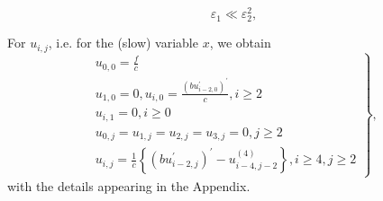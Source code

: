 \documentclass[10pt,a4paper]{amsart}
\begin{document}
\begin{equation}
\varepsilon _{1} \ll \varepsilon _{2}^{2},  \label{eps_relation}
\end{equation}%

For $u_{i,j}$, i.e. for the (slow) variable $x$, we obtain
%
\begin{equation}
\left. 
\begin{array}{c}
u_{0,0} = \frac{f}{c} \\
u_{1,0}=0,u_{i,0}=\frac{\left( bu_{i-2,0}^{\prime }\right) ^{\prime }}{c}%
,i\geq 2 \\  
u_{i,1}=0,i\geq 0 \\
u_{0,j}=u_{1,j}=u_{2,j}=u_{3,j}=0,j\geq 2 \\
u_{i,j}=\frac{1}{c}\left\{ \left( bu_{i-2,j}^{\prime }\right) ^{\prime
}-u_{i-4,j-2}^{(4)}\right\} ,i\geq 4,j\geq 2%
\end{array}%
\right\},  \label{uij}
\end{equation}
with the details appearing in the Appendix.
\end{document}
